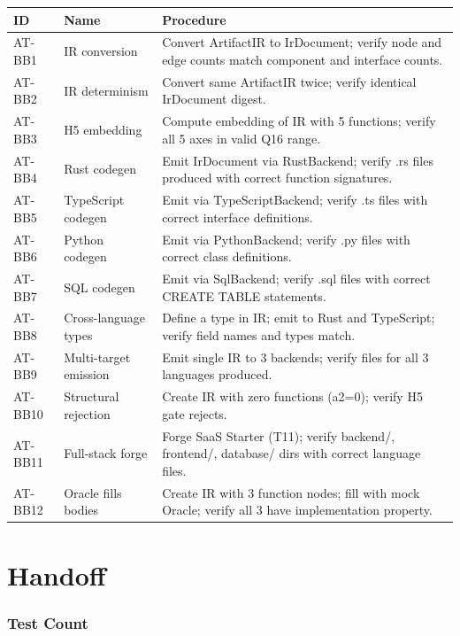 \documentclass[11pt,a4paper,twoside]{article}
\theoremstyle{definition}
\theoremstyle{plain}
\theoremstyle{remark}
\begin{document}
\begin{longtable}{l l p{5.5cm}}
\toprule
\textbf{ID} & \textbf{Name} & \textbf{Procedure} \\
\midrule
\endfirsthead \midrule \endhead \bottomrule \endfoot
AT-BB1 & IR conversion & Convert ArtifactIR to IrDocument; verify
  node and edge counts match component and interface counts. \\
AT-BB2 & IR determinism & Convert same ArtifactIR twice; verify
  identical IrDocument digest. \\
AT-BB3 & H5 embedding & Compute embedding of IR with 5 functions;
  verify all 5 axes in valid Q16 range. \\
AT-BB4 & Rust codegen & Emit IrDocument via RustBackend; verify
  .rs files produced with correct function signatures. \\
AT-BB5 & TypeScript codegen & Emit via TypeScriptBackend; verify
  .ts files with correct interface definitions. \\
AT-BB6 & Python codegen & Emit via PythonBackend; verify .py files
  with correct class definitions. \\
AT-BB7 & SQL codegen & Emit via SqlBackend; verify .sql files with
  correct CREATE TABLE statements. \\
AT-BB8 & Cross-language types & Define a type in IR; emit to Rust
  and TypeScript; verify field names and types match. \\
AT-BB9 & Multi-target emission & Emit single IR to 3 backends;
  verify files for all 3 languages produced. \\
AT-BB10 & Structural rejection & Create IR with zero functions
  (a2=0); verify H5 gate rejects. \\
AT-BB11 & Full-stack forge & Forge SaaS Starter (T11); verify
  backend/, frontend/, database/ dirs with correct language files. \\
AT-BB12 & Oracle fills bodies & Create IR with 3 function nodes;
  fill with mock Oracle; verify all 3 have implementation property. \\
\end{longtable}


\part{Handoff}\label{part:handoff}

\section{Test Count}
\end{document}
